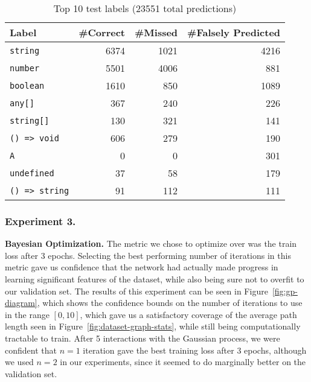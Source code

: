 \begin{table}
  \centering
  \begin{tabular}{lrrr}
    \textbf{Label} & \textbf{\#Correct} & \textbf{\#Missed} & \textbf{\#Falsely Predicted} \\
    \hline
    \texttt{string} & 6374 & 1021 & 4216 \\
    \texttt{number} & 5501 & 4006 & 881 \\
    \texttt{boolean} & 1610 & 850 & 1089 \\
    \texttt{any[]} & 367 & 240 & 226 \\
    \texttt{string[]} & 130 & 321 & 141 \\
    \texttt{() => void} & 606 & 279 & 190 \\
    \texttt{A}  & 0 & 0 & 301 \\
    \texttt{undefined} & 37 & 58 & 179 \\
    \texttt{() => string} & 91 & 112 & 111
  \end{tabular}
  \caption{Top 10 test labels (23551 total predictions)}\label{tab:test-fps}
\end{table}

\subsubsection{Experiment 3.}
\textbf{Bayesian Optimization.}
The metric we chose to optimize over was the train loss after 3 epochs.
Selecting the best performing number of iterations in this metric gave us confidence that the network had actually made progress in learning significant features of the dataset, while also being sure not to overfit to our validation set.
The results of this experiment can be seen in Figure~\ref{fig:gp-diagram}, which shows the confidence bounds on the number of iterations to use in the range $[0, 10]$, which gave us a satisfactory coverage of the average path length seen in Figure~\ref{fig:dataset-graph-stats}, while still being computationally tractable to train.
After 5 interactions with the Gaussian process, we were confident that $n=1$ iteration gave the best training loss after 3 epochs, although we used $n=2$ in our experiments, since it seemed to do marginally better on the validation set.

